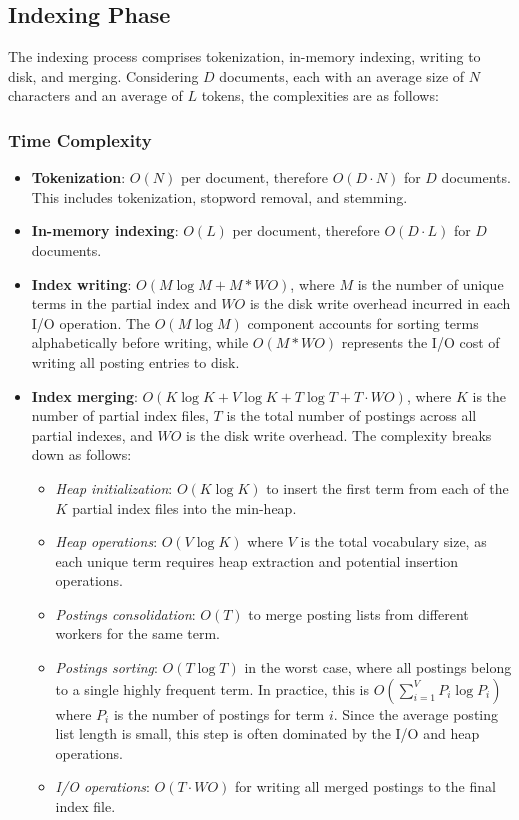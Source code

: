 \documentclass[sigconf]{acmart}
\begin{document}
\subsection{Indexing Phase}
The indexing process comprises tokenization, in-memory indexing, writing to disk, and merging. Considering $D$ documents, each with an average size of $N$ characters and an average of $L$ tokens, the complexities are as follows:
\subsubsection{Time Complexity}
\begin{itemize}
    \item \textbf{Tokenization}: $O(N)$ per document, therefore $O(D \cdot N)$ for $D$ documents. This includes tokenization, stopword removal, and stemming.
    \item \textbf{In-memory indexing}: $O(L)$ per document, therefore $O(D \cdot L)$ for $D$ documents.
    \item \textbf{Index writing}: $O(M \log M + M * WO)$, where $M$ is the number of unique terms in the partial index and $WO$ is the disk write overhead incurred in each I/O operation. The $O(M \log M)$ component accounts for sorting terms alphabetically before writing, while $O(M * WO)$ represents the I/O cost of writing all posting entries to disk.
  \item \textbf{Index merging}: $O(K \log K + V \log K + T \log T + T \cdot WO)$, where $K$ is the number of partial index files, $T$ is the total number of postings across all partial indexes, and $WO$ is the disk write overhead. The complexity breaks down as follows:
  \begin{itemize}
    \item \textit{Heap initialization}: $O(K \log K)$ to insert the first term from each of the $K$ partial index files into the min-heap.
    \item \textit{Heap operations}: $O(V \log K)$ where $V$ is the total vocabulary size, as each unique term requires heap extraction and potential insertion operations.
    \item \textit{Postings consolidation}: $O(T)$ to merge posting lists from different workers for the same term.
    \item \textit{Postings sorting}: $O(T \log T)$ in the worst case, where all postings belong to a single highly frequent term. In practice, this is $O(\sum_{i=1}^{V} P_i \log P_i)$ where $P_i$ is the number of postings for term $i$. Since the average posting list length is small, this step is often dominated by the I/O and heap operations.
    \item \textit{I/O operations}: $O(T \cdot WO)$ for writing all merged postings to the final index file.
  \end{itemize}
\end{itemize}
\end{document}
